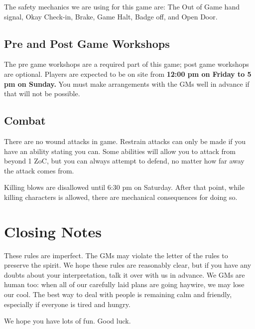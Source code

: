 \documentclass[sheet]{GL2020}
\begin{document}
The safety mechanics we are using for this game are: The Out of Game hand signal, Okay Check-in, Brake, Game Halt, Badge off, and Open Door.

\subsection{Pre and Post Game Workshops}
The pre game workshops are a required part of this game; post game workshops are optional. Players are expected to be on site from \textbf{12:00 pm on Friday to 5 pm on Sunday.} You must make arrangements with the GMs well in advance if that will not be possible.

\subsection{Combat}
There are no wound attacks in game. Restrain attacks can only be made if you have an ability stating you can. Some abilities will allow you to attack from beyond 1 ZoC, but you can always attempt to defend, no matter how far away the attack comes from.

Killing blows are disallowed until 6:30 pm on Saturday. After that point, while killing characters is allowed, there are mechanical consequences for doing so.

\section{Closing Notes}

These rules are imperfect.  The GMs may violate the letter of the rules to preserve the spirit.  We hope these rules are reasonably clear, but if you have any doubts about your interpretation, talk it over with us in advance.  We GMs are human too: when all of our carefully laid plans are going haywire, we may lose our cool.  The best way to deal with people is remaining calm and friendly, especially if everyone is tired and hungry.

We hope you have lots of fun.  Good luck.
\end{document}

